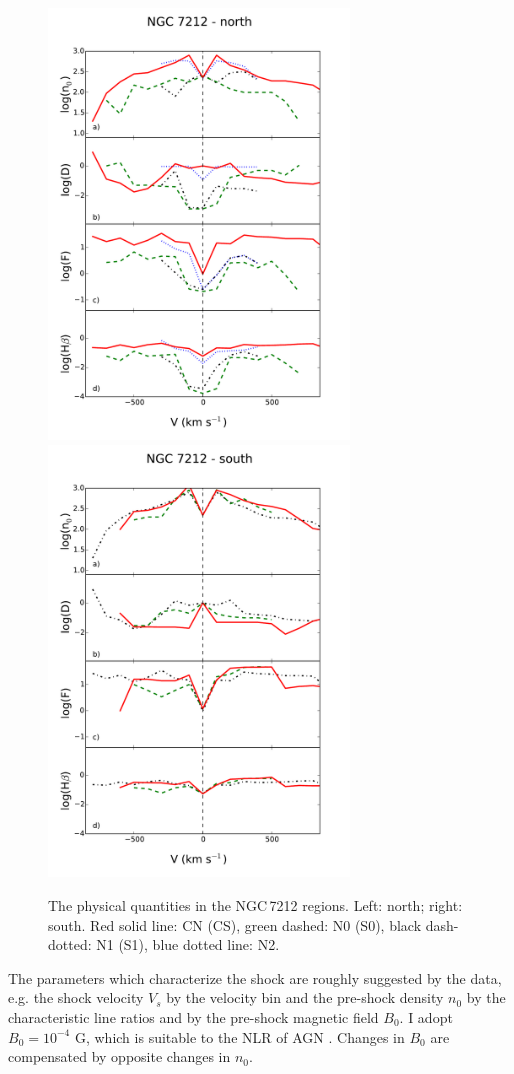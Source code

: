 \documentclass[../main.tex]{subfiles}
\begin{document}
\begin{figure}
\includegraphics[width=8.0cm]{PhD_thesis/images/paper1/n72n.pdf}
\includegraphics[width=8.0cm]{PhD_thesis/images/paper1/n72s.pdf}
\caption{The physical quantities in the NGC\,7212 regions. Left: north; right: south. Red solid line: CN (CS), green dashed: N0 (S0), black dash-dotted: N1 (S1), blue dotted line: N2.}
\label{fig:NGC_m}
\end{figure}


The parameters which characterize the shock are roughly suggested by the data, e.g. the  shock velocity $V_s$ by the velocity bin and the pre-shock density $n_0$ by the characteristic line ratios and by the pre-shock magnetic field $B_0$.
I adopt $B_0  = 10^{-4}$ G, which is suitable to the NLR of AGN \citep{Beck12}.
Changes in $B_0$  are compensated by opposite changes in $n_0$.
\end{document}
